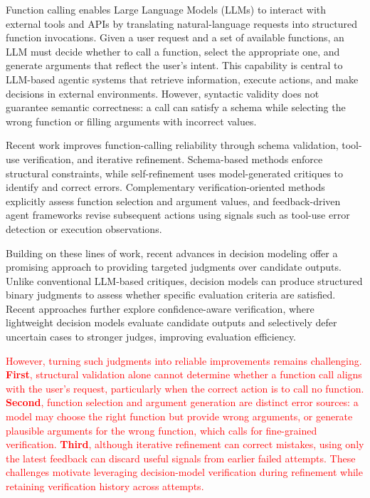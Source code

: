 Function calling enables Large Language Models (LLMs) to interact with external tools and APIs by translating natural-language requests into structured function invocations. Given a user request and a set of available functions, an LLM must decide whether to call a function, select the appropriate one, and generate arguments that reflect the user's intent. This capability is central to LLM-based agentic systems that retrieve information, execute actions, and make decisions in external environments. However, syntactic validity does not guarantee semantic correctness: a call can satisfy a schema while selecting the wrong function or filling arguments with incorrect values.

Recent work improves function-calling reliability through schema validation, tool-use verification, and iterative refinement. Schema-based methods enforce structural constraints, while self-refinement uses model-generated critiques to identify and correct errors. Complementary verification-oriented methods explicitly assess function selection and argument values, and feedback-driven agent frameworks revise subsequent actions using signals such as tool-use error detection or execution observations.

Building on these lines of work, recent advances in decision modeling offer a promising approach to providing targeted judgments over candidate outputs. Unlike conventional LLM-based critiques, decision models can produce structured binary judgments to assess whether specific evaluation criteria are satisfied. Recent approaches further explore confidence-aware verification, where lightweight decision models evaluate candidate outputs and selectively defer uncertain cases to stronger judges, improving evaluation efficiency. 

\textcolor{red}{However, turning such judgments into reliable improvements remains challenging. \textbf{First}, structural validation alone cannot determine whether a function call aligns with the user's request, particularly when the correct action is to call no function. \textbf{Second}, function selection and argument generation are distinct error sources: a model may choose the right function but provide wrong arguments, or generate plausible arguments for the wrong function, which calls for fine-grained verification. \textbf{Third}, although iterative refinement can correct mistakes, using only the latest feedback can discard useful signals from earlier failed attempts. These challenges motivate leveraging decision-model verification during refinement while retaining verification history across attempts.
}

